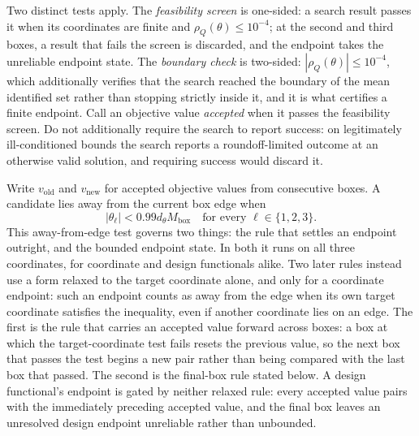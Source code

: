 \documentclass[11pt]{article}
\begin{document}
Two distinct tests apply. The \emph{feasibility screen} is one-sided: a search result passes it when
its coordinates are finite and \(\rho_Q(\theta)\le10^{-4}\); at the second and third boxes, a result
that fails the screen is discarded, and the endpoint takes the unreliable endpoint state. The \emph{boundary check} is two-sided:
\(|\rho_Q(\theta)|\le10^{-4}\), which additionally verifies that the search reached the boundary of
the mean identified set rather than stopping strictly inside it, and it is what certifies a finite
endpoint. Call an objective value \emph{accepted} when it passes the feasibility screen. Do not
additionally require the search to report success: on legitimately
ill-conditioned bounds the search reports a roundoff-limited outcome at an otherwise valid solution,
and requiring success would discard it.

Write \(v_{\mathrm{old}}\) and
\(v_{\mathrm{new}}\) for accepted objective values from consecutive
boxes. A candidate lies away from the current box edge when
\begin{equation*}
 |\theta_\ell|<0.99d_\theta M_{\mathrm{box}}
 \quad\text{for every }\ell\in\{1,2,3\}.
\end{equation*}
This away-from-edge test governs two things: the rule that settles an endpoint outright, and the
bounded endpoint state. In both it runs on all three coordinates, for coordinate and design
functionals alike. Two later rules instead use a form relaxed to the target coordinate alone, and only for a
coordinate endpoint: such an endpoint counts as away from the edge when its own target coordinate
satisfies the inequality, even if another coordinate lies on an edge. The first is the rule that
carries an accepted value forward across boxes: a box at which the target-coordinate test fails
resets the previous value, so the next box that passes the test begins a new pair rather than
being compared with the last box that passed. The second is the final-box rule stated below. A design
functional's endpoint is gated by neither relaxed rule: every accepted value pairs with the
immediately preceding accepted value, and the final box leaves an unresolved design endpoint
unreliable rather than unbounded.
\end{document}
